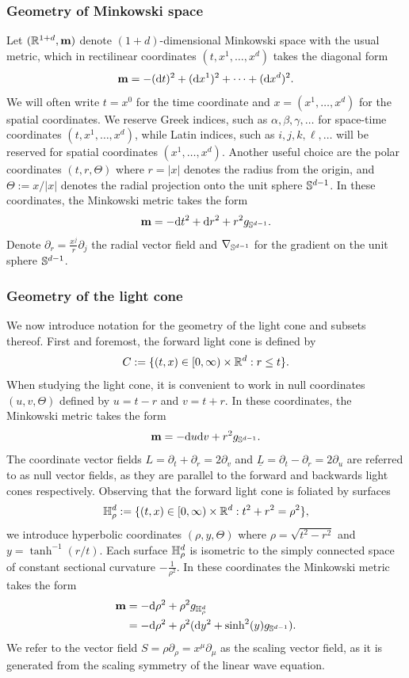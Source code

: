 
\subsubsection*{Geometry of Minkowski space}
Let $(\mathbb R^{1 + d}, {\bf m})$ denote $(1 + d)$-dimensional Minkowski space with the usual metric, which in rectilinear coordinates $(t, x^1, \dots, x^d)$ takes the diagonal form 
	\[ 
		{\bf m} = - (\mathrm{d} t)^2 + (\mathrm{d} x^1)^2 + \dots + (\mathrm{d} x^d)^2. 
	\]
We will often write $t = x^0$ for the time coordinate and $x = (x^1, \dots, x^d)$ for the spatial coordinates. We reserve Greek indices, such as $\alpha, \beta, \gamma, \dots$ for space-time coordinates $(t, x^1, \dots, x^d)$, while Latin indices, such as $i, j, k, \ell,\dots$ will be reserved for spatial coordinates $(x^1, \dots, x^d)$. Another useful choice are the polar coordinates $(t, r, \Theta)$ where $r = |x|$ denotes the radius from the origin, and $\Theta := x/|x|$ denotes the radial projection onto the unit sphere $\mathbb S^{d - 1}$. In these coordinates, the Minkowski metric takes the form 
	\[
		{\bf m} = - \mathrm{d} t^2 + \mathrm{d} r^2 + r^2 g_{\mathbb S^{d - 1}}.
	\]
Denote $\partial_r = \tfrac{x^j}r \partial_j$ the radial vector field and $\nabla_{\mathbb S^{d - 1}}$ for the gradient on the unit sphere $\mathbb S^{d - 1}$. 

\subsubsection*{Geometry of the light cone}

We now introduce notation for the geometry of the light cone and subsets thereof. First and foremost, the forward light cone is defined by 
	\[
		C := \{ (t, x) \in [0, \infty) \times \mathbb R^d : r \leq t \}. 
	\]
When studying the light cone, it is convenient to work in null coordinates $(u, v, \Theta)$ defined by $u = t - r$ and $v = t + r$. In these coordinates, the Minkowski metric takes the form 
	\[
		{\bf m} = - \mathrm{d} u \mathrm{d} v + r^2 g_{\mathbb S^{d -1}}.
	\]
The coordinate vector fields $L = \partial_t + \partial_r = 2 \partial_v$ and $\underline L = \partial_t - \partial_r = 2 \partial_u$ are referred to as null vector fields, as they are parallel to the forward and backwards light cones respectively. Observing that the forward light cone is foliated by surfaces
	\[
		\mathbb H^d_{\rho} := \{ (t, x) \in [0, \infty) \times \mathbb R^d : t^2 + r^2 = \rho^2 \},
	\]
we introduce hyperbolic coordinates $(\rho, y, \Theta)$ where $\rho = \sqrt{t^2 - r^2}$ and $y = \tanh^{-1} (r/t)$. Each surface $\mathbb H^d_\rho$ is isometric to the simply connected space of constant sectional curvature $-\tfrac{1}{\rho^2}$. In these coordinates the Minkowski metric takes the form 
	\begin{align*}
		{\bf m} 
			&= - \mathrm{d} \rho^2 + \rho^2  g_{\mathbb H^d_\rho}\\
			&= - \mathrm{d} \rho^2 + \rho^2 (\mathrm{d} y^2 + \sinh^2 (y) g_{\mathbb S^{d - 1}}).
	\end{align*}
We refer to the vector field $S = \rho \partial_\rho = x^\mu \partial_\mu$ as the scaling vector field, as it is generated from the scaling symmetry of the linear wave equation. 

